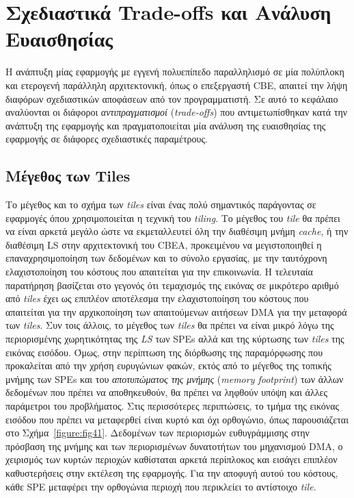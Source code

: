 ﻿\chapter{Σχεδιαστικά Trade-offs και Ανάλυση Ευαισθησίας}
\label{chapter:chap5}

Η ανάπτυξη μίας εφαρμογής με εγγενή πολυεπίπεδο παραλληλισμό σε μία πολύπλοκη και ετερογενή παράλληλη αρχιτεκτονική, όπως ο επεξεργαστή \ac{CBE}, απαιτεί την λήψη διαφόρων σχεδιαστικών αποφάσεων από τον προγραμματιστή. Σε αυτό το κεφάλαιο αναλύονται οι διάφοροι \textsl{αντιπραγματισμοί} (\textsl{trade-offs}) που αντιμετωπίσθηκαν κατά την ανάπτυξη της εφαρμογής και πραγματοποιείται μία ανάλυση της ευαισθησίας της εφαρμογής σε διάφορες σχεδιαστικές παραμέτρους.

\section{Μέγεθος των Tiles}
\label{section:sect51}
\indent
Το μέγεθος και το σχήμα των \textsl{tiles} είναι ένας πολύ σημαντικός παράγοντας σε εφαρμογές όπου χρησιμοποιείται η τεχνική του \textsl{tiling}. Το μέγεθος του \textsl{tile} θα πρέπει να είναι αρκετά μεγάλο ώστε να εκμεταλλευτεί όλη την διαθέσιμη μνήμη \textsl{cache}, ή την διαθέσιμη \ac{LS} στην αρχιτεκτονική του \ac{CBEA}, προκειμένου να μεγιστοποιηθεί η επαναχρησιμοποίηση των δεδομένων και το σύνολο εργασίας, με την ταυτόχρονη ελαχιστοποίηση του κόστους που απαιτείται για την επικοινωνία. Η τελευταία παρατήρηση βασίζεται στο γεγονός ότι τεμαχισμός της εικόνας σε μικρότερο αριθμό από \textsl{tiles} έχει ως επιπλέον αποτέλεσμα την ελαχιστοποίηση του κόστους που απαιτείται για την αρχικοποίηση των απαιτούμενων αιτήσεων \ac{DMA} για την μεταφορά των \textsl{tiles}. Συν τοις άλλοις, το μέγεθος των \textsl{tiles} θα πρέπει να είναι μικρό λόγω της περιορισμένης χωρητικότητας της \textsl{LS} των \acp{SPE} αλλά και της κύρτωσης των \textsl{tiles} της εικόνας εισόδου.\newline \indent
Όμως, στην περίπτωση της διόρθωσης της παραμόρφωσης που προκαλείται από την χρήση ευρυγώνιων φακών, εκτός από το μέγεθος της τοπικής μνήμης των \acp{SPE} και του \textsl{αποτυπώματος της μνήμης} (\textsl{memory footprint}) των άλλων δεδομένων που πρέπει να αποθηκευθούν, θα πρέπει να ληφθούν υπόψη και άλλες παράμετροι του προβλήματος. Στις περισσότερες περιπτώσεις, το τμήμα της εικόνας εισόδου που πρέπει να μεταφερθεί είναι κυρτό και όχι ορθογώνιο, όπως παρουσιάζεται στο Σχήμα~\ref{figure:fig41}. Δεδομένων των περιορισμών ευθυγράμμισης στην πρόσβαση της μνήμης και των περιορισμένων δυνατοτήτων του μηχανισμού \ac{DMA}, ο χειρισμός των κυρτών περιοχών καθίσταται αρκετά περίπλοκος και εισάγει επιπλέον καθυστερήσεις στην εκτέλεση της εφαρμογής. Για την αποφυγή αυτού του κόστους, κάθε \ac{SPE} μεταφέρει την ορθογώνια περιοχή που περικλείει το αντίστοιχο \textsl{tile}.\newline \indent 
